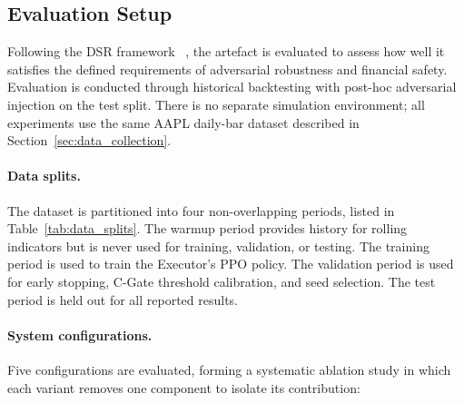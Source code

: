 \subsection{Evaluation Setup}
\label{sec:evaluation-setup}

Following the DSR framework ~\cite {johannesson2014design}, the artefact is
evaluated to assess how well it satisfies the defined requirements of
adversarial robustness and financial safety. Evaluation is conducted
through historical backtesting with post-hoc adversarial injection on the
test split. There is no separate simulation environment; all experiments
use the same AAPL daily-bar dataset described in
Section~\ref{sec:data_collection}.

\paragraph{Data splits.}
The dataset is partitioned into four non-overlapping periods, listed in
Table~\ref{tab:data_splits}. The warmup period provides history for rolling
indicators but is never used for training, validation, or testing. The
training period is used to train the Executor's PPO policy. The validation
period is used for early stopping, C-Gate threshold calibration, and seed
selection. The test period is held out for all reported results.


\paragraph{System configurations.}
Five configurations are evaluated, forming a systematic ablation study in
which each variant removes one component to isolate its contribution:

